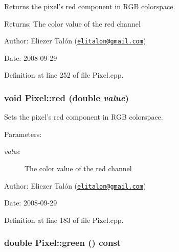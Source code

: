 Returns the pixel's red component in RGB colorspace. 

\begin{Desc}
\item[Returns:]The color value of the red channel\end{Desc}
\begin{Desc}
\item[Author:]Eliezer Talón (\href{mailto:elitalon@gmail.com}{\tt elitalon@gmail.com}) \end{Desc}
\begin{Desc}
\item[Date:]2008-09-29 \end{Desc}


Definition at line 252 of file Pixel.cpp.\hypertarget{class_pixel_cc64470d744c5fc5b26cedb027366b5d}{
\subsubsection[red]{\setlength{\rightskip}{0pt plus 5cm}void Pixel::red (double {\em value})}}
\label{class_pixel_cc64470d744c5fc5b26cedb027366b5d}


Sets the pixel's red component in RGB colorspace. 

\begin{Desc}
\item[Parameters:]
\begin{description}
\item[{\em value}]The color value of the red channel\end{description}
\end{Desc}
\begin{Desc}
\item[Author:]Eliezer Talón (\href{mailto:elitalon@gmail.com}{\tt elitalon@gmail.com}) \end{Desc}
\begin{Desc}
\item[Date:]2008-09-29 \end{Desc}


Definition at line 183 of file Pixel.cpp.\hypertarget{class_pixel_71606a21fe4efc55a5ce5bb318b629f7}{
\subsubsection[green]{\setlength{\rightskip}{0pt plus 5cm}double Pixel::green () const}}
\label{class_pixel_71606a21fe4efc55a5ce5bb318b629f7}


